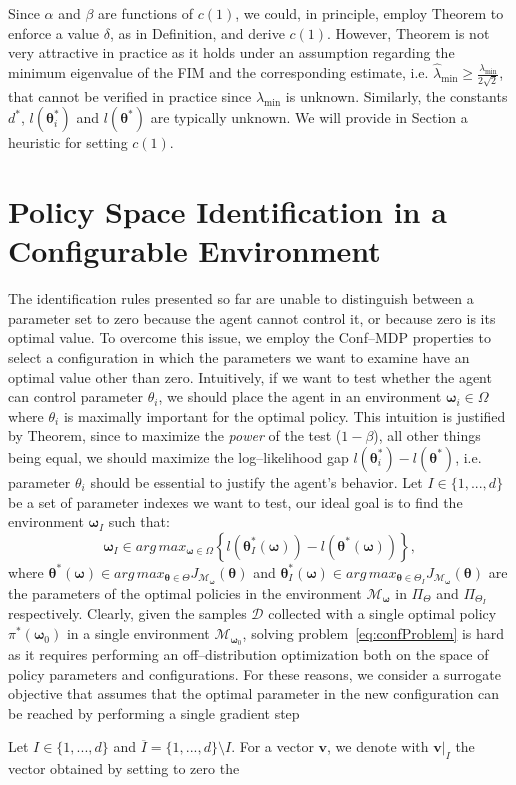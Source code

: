\documentclass[letterpaper]{article} %
\begin{document}
Since $\alpha$ and $\beta$ are functions of $c(1)$, we could, in principle, employ Theorem to enforce a value $\delta$, as in Definition, and derive $c(1)$. However, Theorem is not very attractive in practice as it holds under an assumption regarding the minimum eigenvalue of the FIM and the corresponding estimate, i.e. $\widehat{\lambda}_{\min} \ge \frac{\lambda_{\min}}{2\sqrt{2}}$, that cannot be verified in practice since $\lambda_{\min}$ is unknown. Similarly, the constants $d^*$, ${l}({\mathbf{\theta}}_i^*)$ and ${l}({\mathbf{\theta}^*})$ are typically unknown. We will provide in Section a heuristic for setting $c(1)$. 


\section{Policy Space Identification in a Configurable Environment}
The identification rules presented so far are
unable to distinguish between a parameter set to zero because the agent
cannot control it, or because zero is its optimal value. To overcome this issue, we employ the Conf--MDP properties to select
a configuration in which the parameters we want to examine have an optimal value other than zero. Intuitively, if we want to test whether the agent can control parameter $\theta_i$, we should place the agent in an environment $\mathbf{\omega}_i \in \Omega$ where $\theta_i$ is maximally important
for the optimal policy. This intuition is justified by Theorem, since to maximize the \emph{power} of the test ($1-\beta$), all other things being equal, we should maximize the
log--likelihood gap ${l}({\mathbf{\theta}_i^*}) - {l}({\mathbf{\theta}^*})$, i.e. parameter $\theta_i$ should
be essential to justify the agent's behavior. Let $I \in \{1,...,d\}$ be a set of parameter
indexes we want to test, our ideal goal is to find the environment $\mathbf{\omega}_I$ such that:
\begin{equation}
	\mathbf{\omega}_I \in arg\,max_{\mathbf{\omega} \in \Omega} \left\{ {l}({\mathbf{\theta}_I^*}(\mathbf{\omega})) - {l}({\mathbf{\theta}^*}(\mathbf{\omega})) \right\},
\end{equation}
where ${\mathbf{\theta}^*}(\mathbf{\omega}) \in arg\,max_{\mathbf{\theta} \in \Theta} J_{\mathcal{M}_{\mathbf{\omega}}}(\mathbf{\theta})$ and ${\mathbf{\theta}}_I^*(\mathbf{\omega}) \in arg\,max_{\mathbf{\theta} \in \Theta_I} J_{\mathcal{M}_{\mathbf{\omega}}}(\mathbf{\theta})$ are the parameters of the optimal policies 
in the environment $\mathcal{M}_{\mathbf{\omega}}$ in $\Pi_{\Theta}$ and $\Pi_{\Theta_I}$ respectively. Clearly, given the samples $\mathcal{D}$ collected with a single optimal policy $\pi^*(\mathbf{\omega}_0)$ in a single environment $\mathcal{M}_{\mathbf{\omega}_0}$, solving problem~\eqref{eq:confProblem} is hard as it requires performing an off--distribution optimization both on the space of policy parameters and configurations. For these reasons, we consider a surrogate objective that assumes that the optimal parameter in the new configuration can be reached by performing a single gradient step


Let $I \in \{1,...,d\}$ and $\overline{I} =\{1,...,d\} \setminus I$. For a vector $\mathbf{v}$, we denote with $\mathbf{v} \rvert_I$ the vector obtained by setting to zero the
\end{document}
